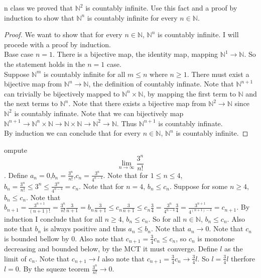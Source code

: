 \documentclass[12pt]{article}
\makeatletter
\theoremstyle{homework}
\newenvironment{exercise}[1]
{\def\@currentlabel{#1}\exercisecore}
{\endexercisecore}
\makeatother
\begin{document}
\begin{exercise}

In class we proved that $\mathbb{N}^2$ is countably infinite. Use this fact and a proof by induction to show that $\mathbb{N}^n$ is countably infinite for every $n \in \mathbb{N}$.
\end{exercise}
\begin{proof}
We want to show that for every $n \in \mathbb{N}$, $\mathbb{N}^n$ is countably infinite.  I will procede with a proof by induction.\\
Base case $n=1$.  There is a bijective map, the identity map, mapping $\mathbb{N}^1\rightarrow\mathbb{N}$.  So the statement holds in the $n=1$ case.\\
Suppose $\mathbb{N}^m$ is countably infinite for all $m\leq n$ where $n\geq 1$.  There must exist a bijective map from $\mathbb{N}^n\rightarrow \mathbb{N}$, the definition of countably infinate.  Note that $\mathbb{N}^{n+1}$ can trivially be bijectively mapped to $\mathbb{N}^n\times \mathbb{N}$, by mapping the first term to $\mathbb{N}$ and the next terms to $\mathbb{N}^n$.  Note that there exists a bijective map from $\mathbb{N}^2\rightarrow \mathbb{N}$ since $\mathbb{N}^2$ is countably infinate.  Note that we can bijectively map $\mathbb{N}^{n+1}\rightarrow \mathbb{N}^n\times \mathbb{N}\rightarrow \mathbb{N}\times \mathbb{N}\rightarrow \mathbb{N}^2\rightarrow \mathbb{N}$.  Thus $\mathbb{N}^{n+1}$ is countably infinate.\\
By induction we can conclude that for every $n \in \mathbb{N}$, $\mathbb{N}^n$ is countably infinite.
\end{proof}
\begin{exercise}

Compute $$\lim_{n\rightarrow\infty}\frac{3^n}{n!}$$.
\end{exercise}
Define $a_n=0$,$b_n=\frac{3^n}{n!}$,$c_n=\frac{3^n}{4^{n-4}}$.  Note that for $1\leq n\leq 4$, $b_n=\frac{3^n}{n!}\leq 3^n\leq \frac{3^n}{4^{n-4}}=c_n$.  Note that for $n=4$, $b_n\leq c_n$.  Suppose for some $n\geq 4$, $b_n\leq c_n$.  Note that $b_{n+1}=\frac{3^{n+1}}{(n+1)!}=\frac{3^{n}}{n!}\frac{3}{n+1}=b_n\frac{3}{n+1}\leq c_n\frac{3}{n+1}\leq c_n\frac{3}{4}=\frac{3^n}{4^{n-4}}\frac{3}{4}=\frac{3^{n+1}}{4^{(n+1)-4}}=c_{n+1}$.  By induction I conclude that for all $n\geq 4$, $b_n\leq c_n$.  So for all $n\in \mathbb{N}$, $b_n\leq c_n$.  Also note that $b_n$ is always positive and thus $a_n\leq b_n$.  Note that $a_n\rightarrow 0$.  Note that $c_n$ is bounded bellow by $0$.  Also note that $c_{n+1}=\frac{3}{4}c_n\leq c_n$, so $c_n$ is monotone decreasing and bounded below, by the MCT it must converge.  Define $l$ as the limit of $c_n$.  Note that $c_{n+1}\rightarrow l$ also note that $c_{n+1}=\frac{3}{4}c_n\rightarrow \frac{3}{4}l$.  So $l=\frac{3}{4}l$ therfore $l=0$.  By the squeze teorem $\frac{3^n}{n!}\rightarrow 0$.
\end{document}
